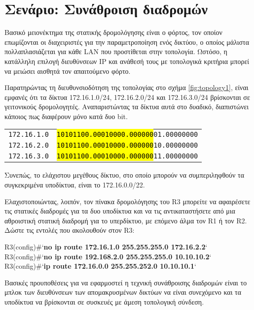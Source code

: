 \documentclass{EdipyLabs} %
\begin{document}
\section{Σενάριο: Συνάθροιση διαδρομών}

Βασικό μειονέκτημα της στατικής δρομολόγησης είναι ο φόρτος, τον οποίον επωμίζονται οι διαχειριστές για την παραμετροποίηση ενός δικτύου, ο οποίος μάλιστα πολλαπλασιάζεται για κάθε LAN που προστίθεται στην τοπολογία. Ωστόσο, η κατάλληλη επιλογή διευθύνσεων IP και ανάθεσή τους με τοπολογικά κριτήρια μπορεί να μειώσει αισθητά τον απαιτούμενο φόρτο.

Παρατηρώντας τη διευθυνσιοδότηση της τοπολογίας στο σχήμα \ref{fig:topology1}, είναι εμφανές ότι τα δίκτυα 172.16.1.0/24, 172.16.2.0/24 και 172.16.3.0/24 βρίσκονται σε γειτονικούς δρομολογητές. Αναπαριστώντας τα δίκτυα αυτά στο δυαδικό, διαπιστώνει κάποιος πως διαφέρουν μόνο κατά δυο bit.

\begin{tabular}{cc}
	\texttt{172.16.1.0} & \texttt{\hl{10101100.00010000.000000}01.00000000}\\
	\texttt{172.16.2.0} & \texttt{\hl{10101100.00010000.000000}10.00000000}\\
	\texttt{172.16.3.0} & \texttt{\hl{10101100.00010000.000000}11.00000000}
\end{tabular}

Συνεπώς, το ελάχιστου μεγέθους δίκτυο, στο οποίο μπορούν να συμπεριληφθούν τα συγκεκριμένα υποδίκτυα, είναι το 172.16.0.0/22.

Ελαχιστοποιώντας, λοιπόν, τον πίνακα δρομολόγησης του R3 μπορείτε να αφαιρέσετε τις στατικές διαδρομές για τα δυο υποδίκτυα και να τις αντικαταστήσετε από μια αθροιστική στατική διαδρομή για το υπερδίκτυο, με επόμενο άλμα τον R1 ή τον R2. Δώστε τις εντολές που ακολουθούν στον R3:

\begin{CommandBox}
R3(config)#`\textbf{no ip route 172.16.1.0 255.255.255.0 172.16.2.2}`
R3(config)#`\textbf{no ip route 192.168.2.0 255.255.255.0 10.10.10.2}`
R3(config)#`\textbf{ip route 172.16.0.0 255.255.252.0 10.10.10.1}`
\end{CommandBox}

Βασικές προυποθέσεις για να εφαρμοστεί η τεχνική συνάθροισης διαδρομών είναι το μπλοκ των διευθύνσεων των απομακρυσμένων δικτύων να είναι συνεχόμενο και τα υποδίκτυα να βρίσκονται σε συσκευές με άμεση τοπολογική σύνδεση. 
\end{document}
